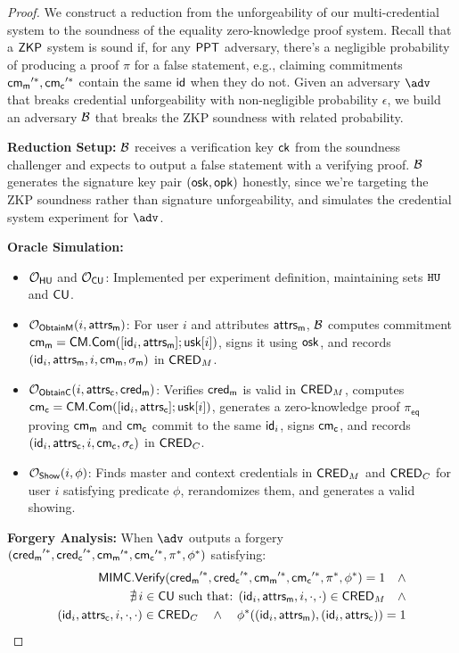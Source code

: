 \begin{proof}
We construct a reduction from the unforgeability of our multi-credential system to the soundness of the equality zero-knowledge proof system. Recall that a $\mathsf{ZKP}$ system is sound if, for any $\mathsf{PPT}$ adversary, there's a negligible probability of producing a proof $\pi$ for a false statement, e.g., claiming commitments $\mathsf{cm_m}'^*, \mathsf{cm_c}'^*$ contain the same $\mathsf{id}$ when they do not.  Given an adversary $\adv$ that breaks credential unforgeability with non-negligible probability $\epsilon$, we build an adversary $\mathcal{B}$ that breaks the ZKP soundness with related probability.


\noindent \textbf{Reduction Setup:} $\mathcal{B}$ receives a verification key $\mathsf{ck}$ from the soundness challenger and expects to output a false statement with a verifying proof. $\mathcal{B}$ generates the signature key pair $(\mathsf{osk}, \mathsf{opk})$ honestly, since we're targeting the ZKP soundness rather than signature unforgeability, and simulates the credential system experiment for $\adv$.

\noindent \textbf{Oracle Simulation:}
\begin{itemize}
    \item $\mathcal{O}_{\mathsf{HU}}$ and $\mathcal{O}_{\mathsf{CU}}$: Implemented per experiment definition, maintaining sets $\mathtt{HU}$ and $\mathsf{CU}$.
    
    \item $\mathcal{O}_{\mathsf{ObtainM}}(i, \mathsf{attrs_m})$: For user $i$ and attributes $\mathsf{attrs_m}$, $\mathcal{B}$ computes commitment $\mathsf{cm_m} = \mathsf{CM.Com}([\mathsf{id}_i, \mathsf{attrs_m}]; \mathsf{usk}[i])$, signs it using $\mathsf{osk}$, and records $(\mathsf{id}_i, \mathsf{attrs_m}, i, \mathsf{cm_m}, \sigma_{\mathsf{m}})$ in $\mathsf{CRED}_M$.
    
    \item $\mathcal{O}_{\mathsf{ObtainC}}(i, \mathsf{attrs_c}, \mathsf{cred_m})$: Verifies $\mathsf{cred_m}$ is valid in $\mathsf{CRED}_M$, computes $\mathsf{cm_c} = \mathsf{CM.Com}([\mathsf{id}_i, \mathsf{attrs_c}]; \mathsf{usk}[i])$, generates a zero-knowledge proof $\pi_{\mathsf{eq}}$ proving $\mathsf{cm_m}$ and $\mathsf{cm_c}$ commit to the same $\mathsf{id}_i$, signs $\mathsf{cm_c}$, and records $(\mathsf{id}_i, \mathsf{attrs_c}, i, \mathsf{cm_c}, \sigma_{\mathsf{c}})$ in $\mathsf{CRED}_C$.
    
    \item $\mathcal{O}_{\mathsf{Show}}(i, \phi)$: Finds master and context credentials in $\mathsf{CRED}_M$ and $\mathsf{CRED}_C$ for user $i$ satisfying predicate $\phi$, rerandomizes them, and generates a valid showing.
\end{itemize}

\noindent \textbf{Forgery Analysis:} When $\adv$ outputs a forgery $(\mathsf{cred_m}'^*, \mathsf{cred_c}'^*, \mathsf{cm_m}'^*, \mathsf{cm_c}'^*, \pi^*, \phi^*)$ satisfying:
\begin{align*}
\mathsf{MIMC.Verify}(\mathsf{cred_m}'^*, \mathsf{cred_c}'^*, \mathsf{cm_m}'^*, \mathsf{cm_c}'^*, \pi^*, \phi^*) = 1 \quad \wedge \\
\nexists\, i \in \mathsf{CU} \text{ such that: } (\mathsf{id}_i, \mathsf{attrs_m}, i, \cdot, \cdot) \in \mathsf{CRED}_M \quad \wedge \\
(\mathsf{id}_i, \mathsf{attrs_c}, i, \cdot, \cdot) \in \mathsf{CRED}_C \quad \wedge \quad
\phi^*((\mathsf{id}_i, \mathsf{attrs_m}), (\mathsf{id}_i, \mathsf{attrs_c})) = 1
\end{align*}


\end{proof}
